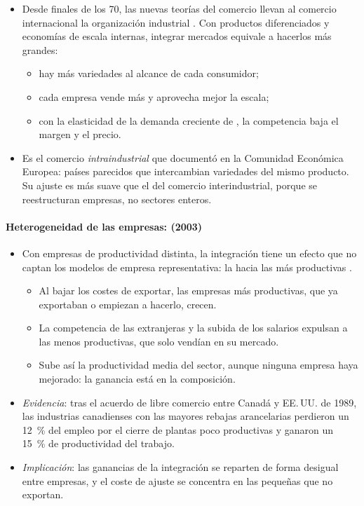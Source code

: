 \documentclass[11pt]{article}
\begin{document}
\begin{itemize}
\item Desde finales de los 70, las nuevas teorías del comercio llevan al comercio internacional la organización industrial . Con productos diferenciados y economías de escala internas\nocite{Krugman1979Increasing}, integrar mercados equivale a hacerlos más grandes:
  \begin{itemize}
  \item hay más variedades al alcance de cada consumidor;
  \item cada empresa vende más y aprovecha mejor la escala;
  \item con la elasticidad de la demanda creciente de , la competencia baja el margen y el precio.
  \end{itemize}
\item Es el comercio \emph{intraindustrial} que \textcite{Grubel1967Intra} documentó en la Comunidad Económica Europea: países parecidos que intercambian variedades del mismo producto. Su ajuste es más suave que el del comercio interindustrial, porque se reestructuran empresas, no sectores enteros.
\end{itemize}

\paragraph{Heterogeneidad de las empresas:  (2003)}

\begin{itemize}
\item Con empresas de productividad distinta\nocite{Melitz2003Impact}, la integración tiene un efecto que no captan los modelos de empresa representativa: la  hacia las más productivas .
  \begin{itemize}
  \item Al bajar los costes de exportar, las empresas más productivas, que ya exportaban o empiezan a hacerlo, crecen.
  \item La competencia de las extranjeras y la subida de los salarios expulsan a las menos productivas, que solo vendían en su mercado.
  \item Sube así la productividad media del sector, aunque ninguna empresa haya mejorado: la ganancia está en la composición.
  \end{itemize}
\item \emph{Evidencia}: tras el acuerdo de libre comercio entre Canadá y EE.\,UU. de 1989, las industrias canadienses con las mayores rebajas arancelarias perdieron un 12~\% del empleo por el cierre de plantas poco productivas y ganaron un 15~\% de productividad del trabajo\nocite{Trefler2004Long}.
\item \emph{Implicación}: las ganancias de la integración se reparten de forma desigual entre empresas, y el coste de ajuste se concentra en las pequeñas que no exportan.
\end{itemize}
\end{document}
